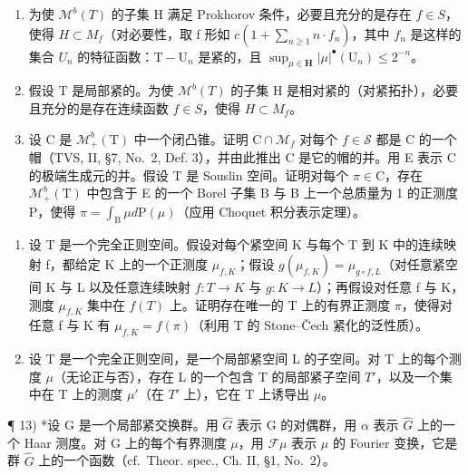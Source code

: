 \begin{enumerate}
\def\labelenumi{\alph{enumi})}
\item
  为使 \(\mathcal{M}^{b}(T)\) 的子集 H 满足 Prokhorov 条件，必要且充分的是存在 \(f \in S\)，使得 \(H \subset M_{f}\)（对必要性，取 f 形如 \(c(1 + \sum_{n \geqslant 1} n \cdot f_{n})\)，其中 \(f_{n}\) 是这样的集合 \(U_{n}\) 的特征函数：\(\mathrm{T} - \mathrm{U}_n\) 是紧的，且 \(\sup_{\mu \in \mathbf{H}} |\mu|^{\bullet} (\mathrm{U}_n) \leqslant 2^{-n}\)。
\item
  假设 T 是局部紧的。为使 \(\mathcal{M}^{b}(T)\) 的子集 H 是相对紧的（对紧拓扑），必要且充分的是存在连续函数 \(f \in S\)，使得 \(H \subset M_{f}\)。
\item
  设 C 是 \(\mathcal{M}_{+}^{b}(\mathrm{T})\) 中一个闭凸锥。证明 \(\mathrm{C} \cap \mathcal{M}_{f}\) 对每个 \(f \in \mathcal{S}\) 都是 C 的一个帽（TVS, II, §7, No.~2, Def. 3），并由此推出 C 是它的帽的并。用 E 表示 C 的极端生成元的并。假设 T 是 Souslin 空间。证明对每个 \(\pi \in \mathrm{C}\)，存在 \(\mathcal{M}_{+}^{b}(\mathrm{T})\) 中包含于 E 的一个 Borel 子集 B 与 B 上一个总质量为 1 的正测度 P，使得 \(\pi = \int_{\mathrm{B}} \mu d\mathrm{P}(\mu)\)（应用 Choquet 积分表示定理）。
\end{enumerate}

\begin{enumerate}
\def\labelenumi{\arabic{enumi})}
\setcounter{enumi}{10}
\item
  设 T 是一个完全正则空间。假设对每个紧空间 K 与每个 T 到 K 中的连续映射 f，都给定 K 上的一个正测度 \(\mu_{f,K}\)；假设 \(g(\mu_{f,K}) = \mu_{g \circ f,L}\)（对任意紧空间 K 与 L 以及任意连续映射 \(f : T \to K\) 与 \(g : K \to L\)）；再假设对任意 f 与 K，测度 \(\mu_{f,K}\) 集中在 \(f(T)\) 上。证明存在唯一的 T 上的有界正测度 \(\pi\)，使得对任意 f 与 K 有 \(\mu_{f,K} = f(\pi)\)（利用 T 的 Stone--Čech 紧化的泛性质）。
\item
  设 T 是一个完全正则空间，是一个局部紧空间 L 的子空间。对 T 上的每个测度 \(\mu\)（无论正与否），存在 L 的一个包含 T 的局部紧子空间 \(T'\)，以及一个集中在 T 上的测度 \(\mu'\)（在 \(T'\) 上），它在 T 上诱导出 \(\mu\)。
\end{enumerate}

¶ 13) *设 G 是一个局部紧交换群。用 \(\widehat{G}\) 表示 G 的对偶群，用 \(\alpha\) 表示 \(\widehat{G}\) 上的一个 Haar 测度。对 G 上的每个有界测度 \(\mu\)，用 \(\mathcal{F}\mu\) 表示 \(\mu\) 的 Fourier 变换，它是群 \(\widehat{G}\) 上的一个函数（cf.~Theor. spec., Ch. II, §1, No.~2）。

